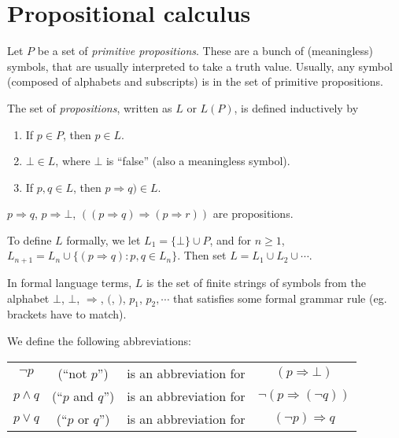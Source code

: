 \documentclass[a4paper]{article}
\begin{document}
\tableofcontents

\section{Propositional calculus}
\begin{defi}[Propositions]
  Let $P$ be a set of \emph{primitive propositions}. These are a bunch of (meaningless) symbols, that are usually interpreted to take a truth value. Usually, any symbol (composed of alphabets and subscripts) is in the set of primitive propositions.

  The set of \emph{propositions}, written as $L$ or $L(P)$, is defined inductively by
  \begin{enumerate}
    \item If $p\in P$, then $p\in L$.
    \item $\bot\in L$, where $\bot$ is ``false'' (also a meaningless symbol).
    \item If $p, q\in L$, then $p\Rightarrow q)\in L$.
  \end{enumerate}
\end{defi}

\begin{eg}
  $p\Rightarrow q$, $p\Rightarrow \bot$, $((p\Rightarrow q)\Rightarrow (p\Rightarrow r))$ are propositions.
\end{eg}

To define $L$ formally, we let $L_1 = \{\bot\}\cup P$, and for $n\geq 1$, $L_{n + 1} = L_n\cup \{(p\Rightarrow q): p, q\in L_n\}$. Then set $L = L_1\cup L_2\cup \cdots$.

In formal language terms, $L$ is the set of finite strings of symbols from the alphabet $\bot$, $\bot$, $\Rightarrow $, $($, $)$, $p_1$, $p_2, \cdots$ that satisfies some formal grammar rule (eg. brackets have to match).

We define the following abbreviations:
\begin{defi}\leavevmode
  \begin{center}
    \begin{tabular}[]{cccc}
      $\neg p$ & (``not $p$'') & is an abbreviation for & $(p\Rightarrow \bot)$\\
      $p\wedge q$ & (``$p$ and $q$'') & is an abbreviation for & $\neg(p\Rightarrow (\neg q))$\\
      $p\vee q$ & (``$p$ or $q$'') & is an abbreviation for & $(\neg p)\Rightarrow q$
    \end{tabular}
  \end{center}
\end{defi}
\end{document}
